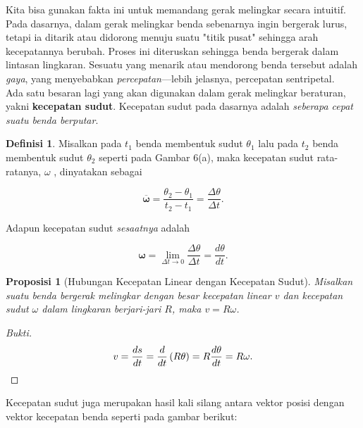\documentclass[12pt, a4paper]{article}\usepackage[utf8]{inputenc}
\theoremstyle{plain}
\theoremstyle{plain}
\newtheorem{prop}[teorema]{Proposisi}
\numberwithin{equation}{section}
\theoremstyle{definition}
\newtheorem{defin}[teorema]{Definisi}
\begin{document}
	\par Kita bisa gunakan fakta ini untuk memandang gerak melingkar secara intuitif. Pada dasarnya, dalam gerak melingkar benda sebenarnya ingin bergerak lurus, tetapi ia ditarik atau didorong menuju suatu "titik pusat" sehingga arah kecepatannya berubah. Proses ini diteruskan sehingga benda bergerak dalam lintasan lingkaran. Sesuatu yang menarik atau mendorong benda tersebut adalah \textit{gaya}, yang menyebabkan \textit{percepatan}---lebih jelasnya, percepatan sentripetal.\\
	
	Ada satu besaran lagi yang akan digunakan dalam gerak melingkar beraturan, yakni \textbf{kecepatan sudut}. Kecepatan sudut pada dasarnya adalah \textit{seberapa cepat suatu benda berputar}. 
	
	\begin{defin}
		Misalkan pada $t_1$ benda membentuk sudut $\theta_{1}$ lalu pada $t_2$ benda membentuk sudut $\theta_{2}$ seperti pada Gambar 6(a), maka kecepatan sudut rata-ratanya, $\omega$ , dinyatakan sebagai
		
		\begin{equation*}
			\boldsymbol{\overline{\omega}} = \frac{\theta_{2} - \theta_{1}}{t_2 - t_1} = \frac{\Delta \theta}{\Delta t}.
		\end{equation*}
		
		Adapun kecepatan sudut \textit{sesaatnya} adalah

		\begin{equation*}
			\boldsymbol{\omega} = \lim_{\Delta t \to 0} \frac{\Delta \theta}{\Delta t} = \frac{d\theta}{dt}.
		\end{equation*}
	\end{defin}
	
	\begin{prop}[Hubungan Kecepatan Linear dengan Kecepatan Sudut]
		Misalkan suatu benda bergerak melingkar dengan besar kecepatan linear $v$ dan kecepatan sudut $\omega$ dalam lingkaran berjari-jari $R$, maka $v = R\omega$.
	\end{prop}
	\begin{proof}[Bukti]
		\vspace{-1em}
		\begin{equation*}
			v = \frac{ds}{dt} = \frac{d}{dt} \left( R \theta \right) = R \frac{d \theta}{dt} = R \omega. \qedhere
		\end{equation*} 
	\end{proof}
	
	Kecepatan sudut juga merupakan hasil kali silang antara vektor posisi dengan vektor kecepatan benda seperti pada gambar berikut:
	
\end{document}
